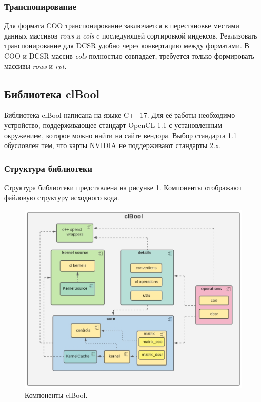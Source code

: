 \documentclass[14pt]{extarticle}
\newcommand{\sectionbreak}{\clearpage}
\newcommand{\txt}{\textit}
\begin{document}
	
	\subsubsection{Транспонирование}
	
	Для формата COO транспонирование заключается в перестановке местами данных массивов \txt{rows} и \txt{cols} c последующей сортировкой индексов. Реализовать транспонирование для DCSR удобно через конвертацию между форматами. В COO и DCSR массив \txt{cols} полностью совпадает, требуется только формировать массивы \txt{rows} и \txt{rpt}.  
	
	
	\sectionbreak
	
	\subsection{Библиотека clBool}
	
	
	Библиотека clBool написана на языке C++17. Для её работы необходимо устройство, поддерживающее стандарт OpenCL 1.1 с установленным окружением, которое можно найти на сайте вендора. Выбор стандарта 1.1 обусловлен тем, что карты NVIDIA не поддерживают стандарты 2.x. 
	
	\subsubsection*{Структура библиотеки}
	
	Структура библиотеки представлена на рисунке \ref{clboolarc}. Компоненты отображают файловую структуру исходного кода. 
	

	\begin{figure}
		\centering
		\includegraphics[width=0.8\linewidth]{picts/clBool_cmps}
		\caption{Компоненты clBool.}
		\label{clboolarc}
	\end{figure}
	 
\end{document}
